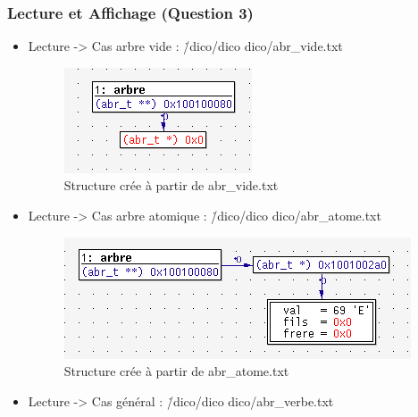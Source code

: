 \documentclass{report}
\begin{document}
\subsubsection{Lecture et Affichage (Question 3)}
\begin{itemize}

    \item Lecture -> Cas arbre vide : \./dico/dico dico/abr\_vide.txt
\vspace{0.5cm}

\vspace{0.5cm}

\begin{figure}[p]
    \caption{\label{abr_vide} Structure crée à partir de abr\_vide.txt}
   \includegraphics[scale=0.60]{./abr_vide.png}
\end{figure}

    \item Lecture -> Cas arbre atomique : \./dico/dico dico/abr\_atome.txt
\vspace{0.5cm}

\vspace{0.5cm}

\begin{figure}[p]
    \caption{\label{abr_atome} Structure crée à partir de abr\_atome.txt}
   \includegraphics[scale=0.60]{./abr_atome.png}
\end{figure}

    \item Lecture -> Cas général : \./dico/dico dico/abr\_verbe.txt
\vspace{0.5cm}

\vspace{0.5cm}


\end{itemize}
\end{document}
